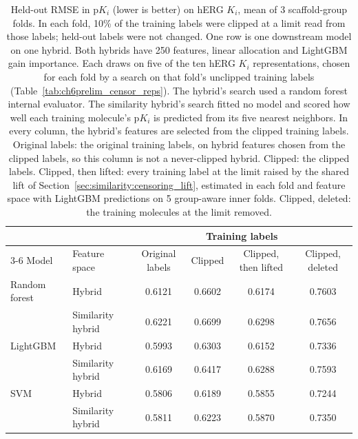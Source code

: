 \begin{table}[htbp]
\centering
\small
\begin{tabular}{@{}llcccc@{}}
\toprule
 & & \multicolumn{4}{c}{Training labels} \\
\cmidrule(l){3-6}
Model & Feature space & Original labels & Clipped & Clipped, then lifted & Clipped, deleted \\
\midrule
Random forest & Hybrid & 0.6121 & 0.6602 & 0.6174 & 0.7603 \\
 & Similarity hybrid & 0.6221 & 0.6699 & 0.6298 & 0.7656 \\
\midrule
LightGBM & Hybrid & 0.5993 & 0.6303 & 0.6152 & 0.7336 \\
 & Similarity hybrid & 0.6169 & 0.6417 & 0.6288 & 0.7593 \\
\midrule
SVM & Hybrid & 0.5806 & 0.6189 & 0.5855 & 0.7244 \\
 & Similarity hybrid & 0.5811 & 0.6223 & 0.5870 & 0.7350 \\
\bottomrule
\end{tabular}
\caption[Correcting clipped labels on hERG $K_i$ in the two hybrids]{Held-out RMSE in p$K_i$ (lower is better) on hERG $K_i$, mean of 3 scaffold-group folds. In each fold, 10\% of the training labels were clipped at a limit read from those labels; held-out labels were not changed. One row is one downstream model on one hybrid. Both hybrids have 250 features, linear allocation and LightGBM gain importance. Each draws on five of the ten hERG $K_i$ representations, chosen for each fold by a search on that fold's unclipped training labels (Table~\ref{tab:ch6prelim_censor_reps}). The hybrid's search used a random forest internal evaluator. The similarity hybrid's search fitted no model and scored how well each training molecule's p$K_i$ is predicted from its five nearest neighbors. In every column, the hybrid's features are selected from the clipped training labels. Original labels: the original training labels, on hybrid features chosen from the clipped labels, so this column is not a never-clipped hybrid. Clipped: the clipped labels. Clipped, then lifted: every training label at the limit raised by the shared lift of Section~\ref{sec:similarity:censoring_lift}, estimated in each fold and feature space with LightGBM predictions on 5 group-aware inner folds. Clipped, deleted: the training molecules at the limit removed.}
\label{tab:ch6prelim_censor_hybrid}
\end{table}

